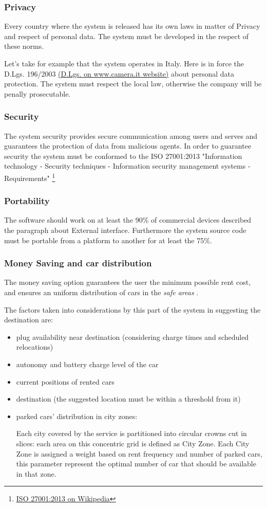 \documentclass[english]{article}
\newcommand{\safeareas}{\textit{safe areas }}
\begin{document}
		\subsubsection{Privacy}
		Every country where the system is released has its own laws in matter of Privacy and respect of personal data. The system must be developed in the respect of these norms.\par Let's take for example that the system operates in Italy. Here is in force the D.Lgs. 196/2003 \href{http://www.camera.it/parlam/leggi/deleghe/03196dl.htm}{(D.Lgs. on www.camera.it website)} about personal data protection. The system must respect the local law, otherwise the company will be penally prosecutable.
		\subsubsection{Security}
		The system security provides secure communication among users and serves and guarantees the protection of data from malicious agents. In order to guarantee security the system must be conformed to the ISO 27001:2013 "Information technology - Security techniques - Information security management systems - Requirements" \footnote{\href{https://en.wikipedia.org/wiki/ISO/IEC_27001:2013}{ISO 27001:2013 on Wikipedia}}
		\subsubsection{Portability}
		The software should work on at least the 90\% of commercial devices described the paragraph about External interface. Furthermore the system source code must be portable from a platform to another for at least the 75\%.		
		
		\subsubsection{Money Saving and car distribution}
		The money saving option guarantees the user the minimum possible rent cost, and ensures an uniform distribution of cars in the \safeareas. \par The factors taken into considerations by this part of the system in suggesting the destination are:
		\begin{itemize}
			\item { plug availability near destination (considering charge times and scheduled relocations) }
			\item { autonomy and battery charge level of the car }
			\item { current positions of rented cars  }
			\item { destination (the suggested location must be within a threshold from it) }
			\item { parked cars' distribution in city zones: \\
				\par Each city covered by the service is partitioned into circular crowns cut in slices: each area on this concentric grid is defined as City Zone. Each City Zone is assigned a weight based on rent frequency and number of parked cars, this parameter represent the optimal number of car that should be available in that zone. 
			}
		\end{itemize} 
		
\end{document}
